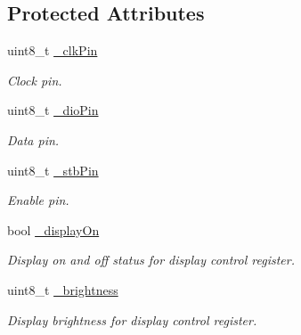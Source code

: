 \subsection*{Protected Attributes}
\begin{DoxyCompactItemize}
\item 
uint8\+\_\+t \hyperlink{class_t_m1638_ab4479c9c4104732b75d3dab088e9af85}{\+\_\+clk\+Pin}\hypertarget{class_t_m1638_ab4479c9c4104732b75d3dab088e9af85}{}\label{class_t_m1638_ab4479c9c4104732b75d3dab088e9af85}

\begin{DoxyCompactList}\small\item\em Clock pin. \end{DoxyCompactList}\item 
uint8\+\_\+t \hyperlink{class_t_m1638_a2bfb09b35261ee2b0721f62c3c881817}{\+\_\+dio\+Pin}\hypertarget{class_t_m1638_a2bfb09b35261ee2b0721f62c3c881817}{}\label{class_t_m1638_a2bfb09b35261ee2b0721f62c3c881817}

\begin{DoxyCompactList}\small\item\em Data pin. \end{DoxyCompactList}\item 
uint8\+\_\+t \hyperlink{class_t_m1638_a859e7cea7ffd158c13483cf98732c13f}{\+\_\+stb\+Pin}\hypertarget{class_t_m1638_a859e7cea7ffd158c13483cf98732c13f}{}\label{class_t_m1638_a859e7cea7ffd158c13483cf98732c13f}

\begin{DoxyCompactList}\small\item\em Enable pin. \end{DoxyCompactList}\item 
bool \hyperlink{class_t_m1638_a62ef809cfcb96e297b4acd1a09cc92e1}{\+\_\+display\+On}\hypertarget{class_t_m1638_a62ef809cfcb96e297b4acd1a09cc92e1}{}\label{class_t_m1638_a62ef809cfcb96e297b4acd1a09cc92e1}

\begin{DoxyCompactList}\small\item\em Display on and off status for display control register. \end{DoxyCompactList}\item 
uint8\+\_\+t \hyperlink{class_t_m1638_aad9c8000c101ae90b1f3426be7d168b0}{\+\_\+brightness}\hypertarget{class_t_m1638_aad9c8000c101ae90b1f3426be7d168b0}{}\label{class_t_m1638_aad9c8000c101ae90b1f3426be7d168b0}

\begin{DoxyCompactList}\small\item\em Display brightness for display control register. \end{DoxyCompactList}\end{DoxyCompactItemize}


